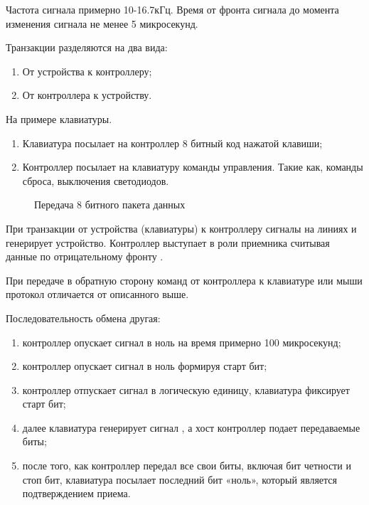 \par{Частота сигнала  примерно 10-16.7кГц. Время от фронта сигнала  до момента изменения сигнала  не менее 5 микросекунд.}

\vspace{4mm}

\par{Транзакции разделяются на два вида:}
  \begin{enumerate}[noitemsep,topsep=0pt, after=\vspace{2pt}]
    \item От устройства к контроллеру;
    \item От контроллера к устройству.
  \end{enumerate}

\par{На примере клавиатуры.}
  \begin{enumerate}[noitemsep,topsep=0pt, after=\vspace{2pt}]
    \item Клавиатура посылает на контроллер 8 битный код нажатой клавиши;
    \item Контроллер посылает на клавиатуру команды управления. Такие как, команды сброса, выключения светодиодов.
  \end{enumerate}

\begin{figure}[H]
	\centering
	\def\svgwidth{\columnwidth}
	
	\caption{Передача 8 битного пакета данных}
\end{figure}

\par{При транзакции от устройства (клавиатуры) к контроллеру сигналы на линиях  и  генерирует устройство. Контроллер выступает в роли приемника считывая данные по отрицательному фронту .}

\par{При передаче в обратную сторону команд от контроллера к клавиатуре или мыши протокол отличается от описанного выше.}

\par{Последовательность обмена другая:}
  \begin{enumerate}[noitemsep,topsep=0pt, after=\vspace{2pt}]
    \item контроллер опускает сигнал  в ноль на время примерно 100 микросекунд;
    \item контроллер опускает сигнал  в ноль формируя старт бит;
    \item контроллер отпускает сигнал  в логическую единицу, клавиатура фиксирует старт бит;
    \item далее клавиатура генерирует сигнал , а хост контроллер подает передаваемые биты;
    \item после того, как контроллер передал все свои биты, включая бит четности и стоп бит, клавиатура посылает последний бит «ноль», который является подтверждением приема.
  \end{enumerate}

